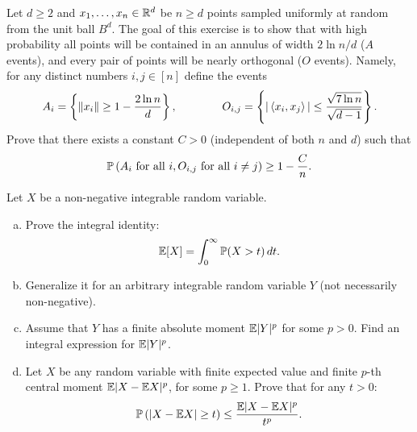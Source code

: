 \begin{myexercise}
    \label{prob:unit_ball_annulus}
    Let $d \geq 2$ and $x_1, \ldots, x_n \in \R^d$ be $n \geq d$ points sampled uniformly at random from the unit ball $B^d$. The goal of this exercise is to show that with high probability all points will be contained in an annulus of width $2 \ln n / d$ ($A$ events), and every pair of points will be nearly orthogonal ($O$ events). Namely, for any distinct numbers $i, j \in [n]$ define the events
    \begin{equation*}
        A_i = \brac{\norm{x_i} \geq 1 - \frac{2\ln n}{d}},
        \qquad\qquad
        O_{i,j} = \brac{\abs{\bran{x_i, x_j}} \leq \frac{ \sqrt{7 \ln n}}{\sqrt{d-1}}}.
    \end{equation*}
    Prove that there exists a constant $C > 0$ (independent of both $n$ and $d$) such that
    \begin{equation*}
        \P\brap{A_i \text{ for all } i, O_{i,j} \text{ for all } i \neq j} \geq 1 - \frac{C}{n}.
    \end{equation*}
\end{myexercise}

\begin{myexercise}
    \label{prob:integral_identity}
    Let $X$ be a non-negative integrable random variable.
    \begin{enumerate}[(a)]
        \item Prove the integral identity:
        \begin{equation*}
            \mathbb{E}[X] = \int_{0}^{\infty} \P(X>t) \, dt.
        \end{equation*}
        
        \item Generalize it for an arbitrary integrable random variable $Y$ (not necessarily non-negative).
        
        \item Assume that $Y$ has a finite absolute moment $\E |Y|^p$ for some $p>0$. Find an integral expression for $\E |Y|^p$.

        \item Let $X$ be any random variable with finite expected value and finite $p$-th central moment $\E\abs{X-\E X}^p$, for some $p \ge 1$. Prove that for any $t > 0$:
        \begin{equation*}
            \P\brap{\abs{X-\E X} \geq t} \leq \frac{\E\abs{X-\E X}^p}{t^p}.
        \end{equation*}
    \end{enumerate}
\end{myexercise}

